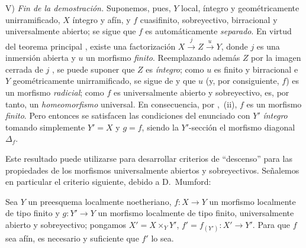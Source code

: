 V) \emph{Fin de la demostración.}
Suponemos, pues, $Y$ local, íntegro y geométricamente unirramificado, $X$ íntegro y afín, y $f$ cuasifinito, sobreyectivo, birracional y universalmente abierto; se sigue que $f$ es automáticamente \emph{separado}.
En virtud del teorema principal , existe una factorización $X\xrightarrow{j}Z\xrightarrow{u}Y$, donde $j$ es una inmersión abierta y $u$ un morfismo \emph{finito}.
Reemplazando además $Z$ por la imagen cerrada de $j$ , se puede suponer que $Z$ es \emph{íntegro}; como $u$ es finito y birracional e $Y$ geométricamente unirramificado, se sigue de  y  que $u$ (y, por consiguiente, $f$) es un morfismo \emph{radicial}; como $f$ es universalmente abierto y sobreyectivo, es, por tanto, un \emph{homeomorfismo} universal.
En consecuencia, por ,~(ii), $f$ es un morfismo \emph{finito}.
Pero entonces se satisfacen las condiciones del enunciado con $Y'$ \emph{íntegro} tomando simplemente $Y'=X$ y $g=f$, siendo la $Y'$-sección el morfismo diagonal $\Delta_f$.

Este resultado puede utilizarse para desarrollar criterios de ``descenso'' para las propiedades de los morfismos universalmente abiertos y sobreyectivos.
Señalemos en particular el criterio siguiente, debido a D.\ Mumford:

\begin{corollary}[14.5.11]
\label{IV.14.5.11}
Sea $Y$ un preesquema localmente noetheriano, $f:X\to Y$ un morfismo localmente de tipo finito y $g:Y'\to Y$ un morfismo localmente de tipo finito, universalmente abierto y sobreyectivo; pongamos $X'=X\times_Y Y'$, $f'=f_{(Y')}:X'\to Y'$.
Para que $f$ sea afín, es necesario y suficiente que $f'$ lo sea.
\end{corollary}

